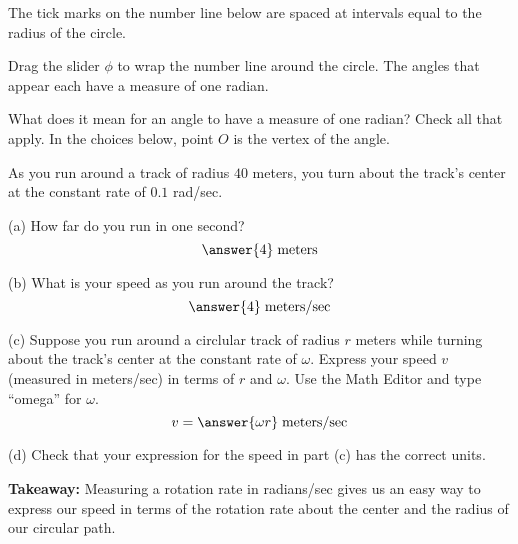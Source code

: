 \documentclass{ximera}
\begin{document}
\begin{exploration} \label{Esaghp:Cross}
The tick marks on the number line below are spaced at intervals equal to the radius of the circle.

Drag the slider $\phi$ to wrap the number line around the circle. The angles that appear each have a measure of one radian.

 
\begin{onlineOnly}
    \begin{center}
\end{center}
\end{onlineOnly}


\begin{question}   \label{Qsatd4th:Cross}
What does it mean for an angle to have a measure of one radian? Check all that apply. In the choices below, point $O$ is the vertex of the angle. 

\begin{selectAll}  
  \end{selectAll}  

\end{question}


\begin{question}  \label{Qt467743:Cross}
As you run around a track of radius $40$ meters, you turn about the track's center at the constant rate of $0.1$ rad/sec.

(a) How far do you run in one second?
\[
   \answer{4} \; \text{meters}
\]

(b) What is your speed as you run around the track?
\[
     \answer{4} \; \text{meters/sec} 
\]

(c) Suppose you run around a circlular track of radius $r$ meters while turning about the track's center at the constant rate of $\omega$. Express your speed $v$ (measured in meters/sec) in terms of $r$ and $\omega$. Use the Math Editor and type ``omega'' for $\omega$. 
\[
      v = \answer{\omega r} \; \text{meters/sec}
\]

(d) Check that your expression for the speed in part (c) has the correct units.


{\bf Takeaway:} Measuring a rotation rate in radians/sec gives us an easy way to express our speed in terms of the rotation rate about the center and the radius of our circular path.

\end{question}
\end{exploration}
\end{document}
